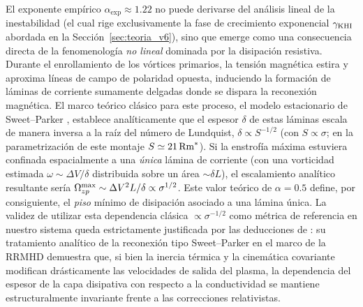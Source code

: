\primerparrafo El exponente empírico $\alpha_{\mathrm{exp}} \approx 1.22$ no puede derivarse del análisis lineal de la inestabilidad (el cual rige exclusivamente la fase de crecimiento exponencial $\gamma_{\mathrm{KHI}}$ abordada en la Sección~\ref{sec:teoria_v6}), sino que emerge como una consecuencia directa de la fenomenología \emph{no lineal} dominada por la disipación resistiva. Durante el enrollamiento de los vórtices primarios, la tensión magnética estira y aproxima líneas de campo de polaridad opuesta, induciendo la formación de láminas de corriente sumamente delgadas donde se dispara la reconexión magnética. El marco teórico clásico para este proceso, el modelo estacionario de Sweet--Parker \parencite{parker1957}, establece analíticamente que el espesor $\delta$ de estas láminas escala de manera inversa a la raíz del número de Lundquist, $\delta \propto S^{-1/2}$ (con $S \propto \sigma$; en la parametrización de este montaje $S \simeq 21\,\mathrm{Rm}^{*}$). Si la enstrofía máxima estuviera confinada espacialmente a una \emph{única} lámina de corriente (con una vorticidad estimada $\omega \sim \Delta V / \delta$ distribuida sobre un área $\sim \delta L$), el escalamiento analítico resultante sería $\Omega_{zp}^{\max} \sim \Delta V^2 L / \delta \propto \sigma^{1/2}$. Este valor teórico de $\alpha = 0.5$ define, por consiguiente, el \emph{piso} mínimo de disipación asociado a una lámina única. La validez de utilizar esta dependencia clásica $\propto \sigma^{-1/2}$ como métrica de referencia en nuestro sistema queda estrictamente justificada por las deducciones de \textcite{lyubarsky2005}: su tratamiento analítico de la reconexión tipo Sweet--Parker en el marco de la RRMHD demuestra que, si bien la inercia térmica y la cinemática covariante modifican drásticamente las velocidades de salida del plasma, la dependencia del espesor de la capa disipativa con respecto a la conductividad se mantiene estructuralmente invariante frente a las correcciones relativistas.

